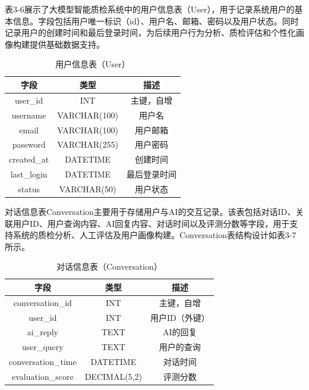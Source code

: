 表3-6展示了大模型智能质检系统中的用户信息表（User），用于记录系统用户的基本信息。字段包括用户唯一标识（id）、用户名、邮箱、密码以及用户状态。同时记录用户的创建时间和最后登录时间，为后续用户行为分析、质检评估和个性化画像构建提供基础数据支持。
\begin{table}[h!]
\centering
\caption{用户信息表（User）}
\begin{tabular}{|c|c|c|}
\hline
字段        & 类型         & 描述                    \\
\hline
user\_id          & INT          & 主键，自增              \\
username    & VARCHAR(100) & 用户名                  \\
email       & VARCHAR(100) & 用户邮箱                \\
password    & VARCHAR(255) & 用户密码                \\
created\_at & DATETIME     & 创建时间                \\
last\_login & DATETIME     & 最后登录时间            \\
status      & VARCHAR(50)  & 用户状态                \\
\hline
\end{tabular}
\end{table}

对话信息表Conversation主要用于存储用户与AI的交互记录。该表包括对话ID、关联用户ID、用户查询内容、AI回复内容、对话时间以及评测分数等字段，用于支持系统的质检分析、人工评估及用户画像构建。Conversation表结构设计如表3-7所示。
\begin{table}[h!]
\centering
\caption{对话信息表（Conversation）}
\begin{tabular}{|c|c|c|}
\hline
字段            & 类型         & 描述                    \\
\hline
conversation\_id              & INT          & 主键，自增              \\
user\_id        & INT          & 用户ID（外键）          \\
ai\_reply       & TEXT         & AI的回复                \\
user\_query     & TEXT         & 用户的查询              \\
conversation\_time & DATETIME   & 对话时间                \\
evaluation\_score & DECIMAL(5,2) & 评测分数                \\
\hline
\end{tabular}
\end{table}


